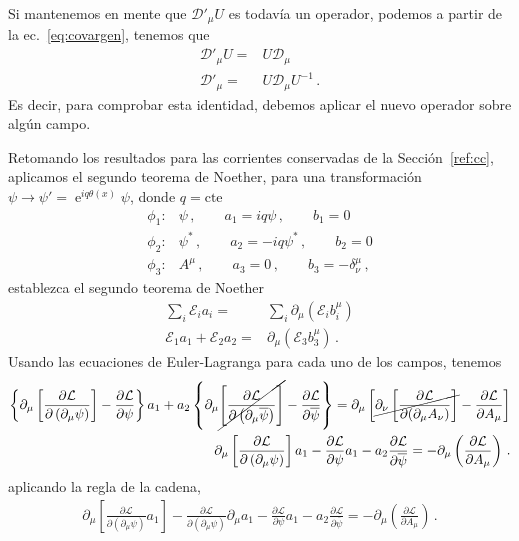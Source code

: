 \begin{frame}
Si mantenemos en mente que  $\mathcal{D}'_\mu U$ es todavía un operador, podemos a partir de la ec.~\eqref{eq:covargen},
tenemos que
\begin{align}
    \mathcal{D}'_\mu U=&U\mathcal{D}_\mu \nonumber\\
    \mathcal{D}'_\mu =&U\mathcal{D}_\mu U^{-1} \,.
\end{align}
Es decir, para comprobar esta identidad, debemos aplicar el nuevo operador sobre algún campo.


Retomando los resultados para las corrientes conservadas de la Sección~\ref{ref:cc}, aplicamos el segundo teorema de Noether, para una transformación $\psi\to \psi'= \operatorname{e}^{iq\theta(x)}\psi$, donde $q=\text{cte} $
\begin{align}
\label{eq:dpa}
  \phi_{1}:& \psi\,,\qquad a_{1}=iq \psi \,,\qquad b_1=0\nonumber\\
  \phi_{2}:& \psi^{*}\,,\qquad a_{2}=-iq\psi^{*}\,,\qquad b_2=0 \nonumber\\
  \phi_{3}:& A^{\mu}\,,\qquad a_{3}=0\,,\qquad b_3=-\delta^{\mu}_{\nu}\,,
\end{align}
establezca el segundo teorema de Noether
\begin{align}
  \sum_i \mathcal{E}_ia_i=&\sum_i  \partial_{\mu}   \left(  \mathcal{E}_i b^{\mu}_i  \right)\nonumber\\
  \mathcal{E}_1a_1+\mathcal{E}_2a_2=&
   \partial_{\mu}   \left(  \mathcal{E}_3 b^{\mu}_3  \right)\,.
\end{align}
Usando las ecuaciones de Euler-Lagranga para cada uno de los campos, tenemos
\begin{align}
\left\{
\partial_{\mu}\left[
\frac{\partial\mathcal{L}}{\partial\left(\partial_{\mu} \psi\right)}
\right]-\frac{\partial \mathcal{L}}{\partial\psi}
\right\} a_{1}
+
a_{2}\left\{\partial_{\mu}\cancel{\left[\frac{\partial \mathcal{L}}{\partial\left(\partial_{\mu} \overline{\psi}\right)}\right]}- \frac{\partial \mathcal{L}}{\partial \overline{\psi}}\right\}
=\partial_{\mu}\left[\cancel{\partial_{\nu}\left[\frac{\partial \mathcal{L}}{\partial (\partial_{\mu} A_{\nu})}\right]}-\frac{\partial \mathcal{L}}{\partial A_{\mu}}\right]\nonumber\\
\partial_{\mu}\left[
\frac{\partial\mathcal{L}}{\partial\left(\partial_{\mu} \psi\right)}
\right] a_{1}
-\frac{\partial \mathcal{L}}{\partial\psi}a_1
-a_2\frac{\partial \mathcal{L}}{\partial \overline{\psi}}
=-\partial_{\mu}\left(\frac{\partial \mathcal{L}}{\partial A_{\mu}}\right)\,.
\end{align}
aplicando la regla de la cadena, %
\begin{align}
\partial_{\mu}\left[
\frac{\partial\mathcal{L}}{\partial\left(\partial_{\mu} \psi\right)}
a_{1}
\right]
-
\frac{\partial\mathcal{L}}{\partial\left(\partial_{\mu} \psi\right)}
\partial_{\mu}a_{1}
-\frac{\partial \mathcal{L}}{\partial\psi}a_1
-a_2\frac{\partial \mathcal{L}}{\partial \overline{\psi}}
=-\partial_{\mu}\left(\frac{\partial \mathcal{L}}{\partial A_{\mu}}\right)\,.
\end{align}


\end{frame}
